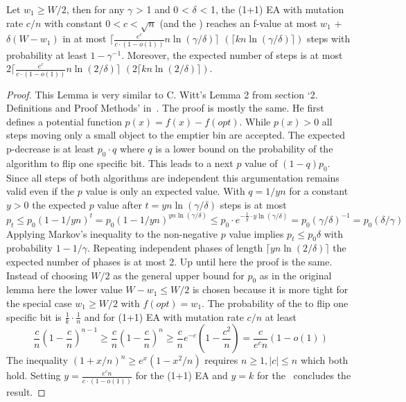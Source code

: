 \begin{lemma}\label{lemma:CWittRefined}
    Let $w_1\ge W/2$, then for any $\gamma$ > 1 and 0 < $\delta$ < 1, the (1+1) EA with mutation rate $c/n$ with constant $0<c<\sqrt{n}$ (and the \RLSR[k]) reaches an f-value at most $w_1$ + $\delta(W-w_1)$ in at most $\lceil\frac{e^c}{c\cdot(1-o(1))}n\ln(\gamma/\delta)\rceil$ $(\lceil kn\ln(\gamma/\delta)\rceil)$ steps with probability at least $1-\gamma^{-1}$. Moreover, the expected number of steps is at most $2\lceil\frac{e^c}{c\cdot(1-o(1))}n\ln(2/\delta)\rceil$ $(2\lceil kn\ln(2/\delta)\rceil)$.
\end{lemma}
\begin{proof}
    This Lemma is very similar to C. Witt's  Lemma 2 from section `2. Definitions and Proof Methods' in~\cite{witt2005worst}.
    The proof is mostly the same.
    He first defines a potential function $p(x)=f(x)-f(opt)$.
    While $p(x)>0$ all steps moving only a small object to the emptier bin are accepted.
    The expected p-decrease is at least $p_0\cdot q$ where $q$ is a lower bound on the probability of the algorithm to flip one specific bit.
    This leads to a next $p$ value of $(1-q)p_0$.
    Since all steps of both algorithms are independent this argumentation remains valid even if the $p$ value is only an expected value.
    With $q=1/yn$ for a constant $y>0$ the expected $p$ value after $t=yn\ln(\gamma/\delta)$ steps is at most
    \[p_t\le p_0{(1-1/yn)}^t=p_0{(1-1/yn)}^{yn\ln(\gamma/\delta)}\le p_0\cdot e^{-\frac{1}{y}\cdot y\ln(\gamma/\delta)}=p_0{(\gamma/\delta)}^{-1} = p_0(\delta/\gamma)\]
    Applying Markov's inequality to the non-negative $p$ value implies $p_t\le p_0\delta$ with probability $1-1/\gamma$.
    Repeating independent phases of length $\lceil yn\ln(2/\delta)\rceil$ the expected number of phases is at most 2.
    Up until here the proof is the same.\newline
    Instead of choosing $W/2$ as the general upper bound for $p_0$ as in the original lemma here the lower value $W-w_1\le W/2$ is chosen because it is more tight for the special case $w_1\ge W/2$ with $f(opt)=w_1$.
    The probability of the \RLSR[k] to flip one specific bit is \(\frac{1}{k}\cdot\frac{1}{n}\) and for (1+1) EA with mutation rate $c/n$ at least
    \[
        \frac{c}{n}{(1-\frac{c}{n})}^{n-1}
        \ge \frac{c}{n}{(1-\frac{c}{n})}^{n}
        \ge \frac{c}{n}e^{-c}(1-\frac{c^2}{n})
        = \frac{c}{e^c n}(1-o(1))
    \]
    The inequality \({(1+x/n)}^n\ge e^x (1-{x^2}/n)\) requires $n\ge1, |c|\le n$ which both hold.
    Setting $y=\frac{e^c n}{c\cdot(1-o(1))}$ for the (1+1) EA and $y=k$ for the \RLSR~concludes the result.
\end{proof}

